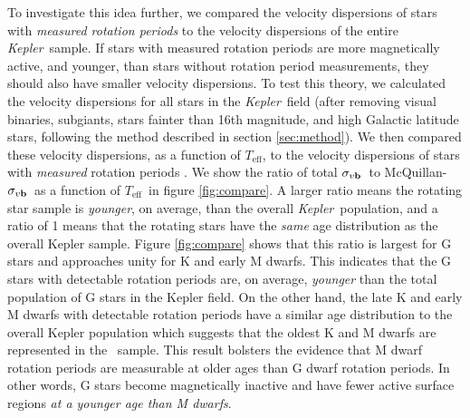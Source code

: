 \documentclass{aastex63}
\newcommand{\ie}{{\it i.e.}}
\newcommand{\kepler}{{\it Kepler}}
\newcommand{\Kepler}{{\it Kepler}}
\newcommand{\teff}{$T_{\mathrm{eff}}$}
\newcommand{\sigmavb}{$\sigma_{v{\bf b}}$}
\newcommand{\mct}{\citet{mcquillan2014}}
\newcommand{\racomment}[1]{{\color{blue}#1}}
\begin{document}
\racomment{
    To investigate this idea further, we compared the velocity dispersions of
stars with {\it measured rotation periods} to the velocity dispersions of the
entire \kepler\ sample.
If stars with measured rotation periods are more magnetically active, and
younger, than stars without rotation period measurements, they should also
have smaller velocity dispersions.
To test this theory, we calculated the velocity dispersions for all stars in
the \kepler\ field (after removing visual binaries, subgiants, stars fainter
than 16th magnitude, and high Galactic latitude stars, following the method
described in section \ref{sec:method}).
We then compared these velocity dispersions, as a function of
\teff, to the velocity dispersions of stars with {\it measured} rotation
periods \citep[\ie\ stars that appear in table 1 of][]{mcquillan2014}.
We show the ratio of total \sigmavb\ to McQuillan-\sigmavb\ as a
function of \teff\ in figure \ref{fig:compare}.}
A larger ratio means the rotating star sample is {\it younger}, on average,
than the overall \Kepler\ population, and a ratio of 1 means that the rotating
stars have the {\it same} age distribution as the overall Kepler sample.
Figure \ref{fig:compare} shows that this ratio is largest for G stars and
approaches unity for K and early M dwarfs.
This indicates that the G stars with detectable rotation periods are, on
average, {\it younger} than the total population of G stars in the Kepler
field.
On the other hand, the late K and early M dwarfs with detectable rotation
periods have a similar age distribution to the overall Kepler population which
suggests that the oldest K and M dwarfs are represented in the \mct\ sample.
This result bolsters the evidence that M dwarf rotation periods are measurable
at older ages than G dwarf rotation periods.
In other words, G stars become magnetically inactive and have fewer active
surface regions {\it at a younger age than M dwarfs}.
\end{document}
